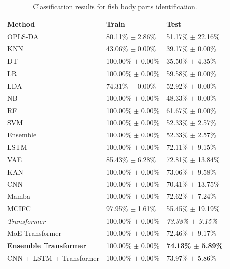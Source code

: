 \begin{table}[t]
\centering
\caption{Classification results for fish body parts identification.}
\label{tab:parts_results}
\begin{tabular}{l|l|l} \\
\hline
Method & Train & Test \\
\hline
OPLS-DA & 80.11\% $\pm$ 2.86\% & 51.17\% $\pm$ 22.16\% \\
KNN & 43.06\% $\pm$ 0.00\% & 39.17\% $\pm$ 0.00\% \\
DT & 100.00\% $\pm$ 0.00\% & 35.50\% $\pm$ 4.35\% \\
LR & 100.00\% $\pm$ 0.00\% & 59.58\% $\pm$ 0.00\% \\
LDA & 74.31\% $\pm$ 0.00\% & 52.92\% $\pm$ 0.00\% \\
NB & 100.00\% $\pm$ 0.00\% & 48.33\% $\pm$ 0.00\% \\
RF & 100.00\% $\pm$ 0.00\% & 61.67\% $\pm$ 0.00\% \\
SVM & 100.00\% $\pm$ 0.00\% & 52.33\% $\pm$ 2.57\% \\
Ensemble & 100.00\% $\pm$ 0.00\% & 52.33\% $\pm$ 2.57\% \\
LSTM & 100.00\% $\pm$ 0.00\% & 72.11\% $\pm$ 9.15\% \\
VAE & 85.43\% $\pm$ 6.28\% & 72.81\% $\pm$ 13.84\% \\
KAN & 100.00\% $\pm$ 0.00\% & 73.06\% $\pm$ 9.58\% \\
CNN & 100.00\% $\pm$ 0.00\% & 70.41\% $\pm$ 13.75\% \\
Mamba & 100.00\% $\pm$ 0.00\% & 72.62\% $\pm$ 7.24\% \\
MCIFC & 97.95\% $\pm$ 1.61\% & 55.45\% $\pm$ 19.19\% \\
\textit{Transformer} & 100.00\% $\pm$ 0.00\% & \textit{73.38\% $\pm$ 9.15\%} \\
MoE Transformer & 100.00\% $\pm$ 0.00\% & 72.46\% $\pm$ 9.17\% \\
\textbf{Ensemble Transformer} & 100.00\% $\pm$ 0.00\% & \textbf{74.13\% $\pm$ 5.89\%} \\ 
CNN + LSTM + Transformer & 100.00\% $\pm$ 0.00\% & 73.97\% $\pm$ 5.86\% \\ 
\hline
\end{tabular}
\end{table}

